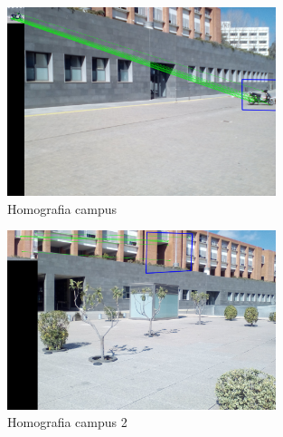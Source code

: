 \newpage
		\begin{figure}[H]
			\centering
			\includegraphics[width=0.7\textwidth]{images/uniSel}
			\caption{Homografia campus}
		\end{figure}
		\begin{figure}[H]
			\centering
			\includegraphics[width=0.7\textwidth]{images/uniSel5}
			\caption{Homografia campus 2}
		\end{figure}
